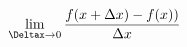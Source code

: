 \documentclass[preview]{standalone}
\begin{document}
\begin{align*}
\lim_{\Deltax \to 0} \frac{f(x+\Delta x) - f(x))}{\Delta x}
\end{align*}
\end{document}
